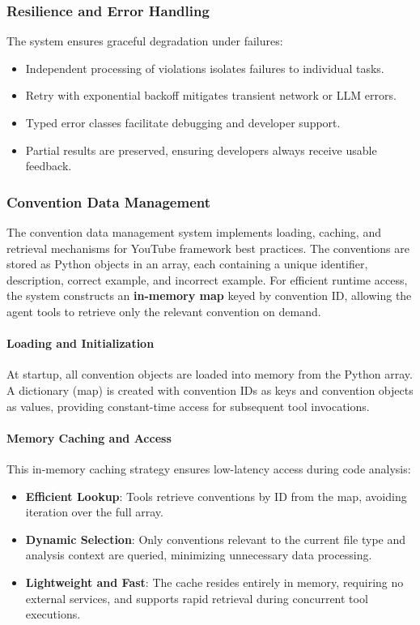 \begin{spacing}{1.2}
\subsubsection{Resilience and Error Handling}
The system ensures graceful degradation under failures:
\begin{itemize}
    \item Independent processing of violations isolates failures to individual tasks.
    \item Retry with exponential backoff mitigates transient network or LLM errors.
    \item Typed error classes facilitate debugging and developer support.
    \item Partial results are preserved, ensuring developers always receive usable feedback.
\end{itemize}

\subsubsection{Convention Data Management}
The convention data management system implements loading, caching, and retrieval mechanisms for YouTube framework best practices. The conventions are stored as Python objects in an array, each containing a unique identifier, description, correct example, and incorrect example. For efficient runtime access, the system constructs an \textbf{in-memory map} keyed by convention ID, allowing the agent tools to retrieve only the relevant convention on demand. 

\paragraph{Loading and Initialization}
At startup, all convention objects are loaded into memory from the Python array. A dictionary (map) is created with convention IDs as keys and convention objects as values, providing constant-time access for subsequent tool invocations.

\paragraph{Memory Caching and Access}
This in-memory caching strategy ensures low-latency access during code analysis:

\begin{itemize}
    \item \textbf{Efficient Lookup}: Tools retrieve conventions by ID from the map, avoiding iteration over the full array.
    \item \textbf{Dynamic Selection}: Only conventions relevant to the current file type and analysis context are queried, minimizing unnecessary data processing.
    \item \textbf{Lightweight and Fast}: The cache resides entirely in memory, requiring no external services, and supports rapid retrieval during concurrent tool executions.
\end{itemize}


\end{spacing}
